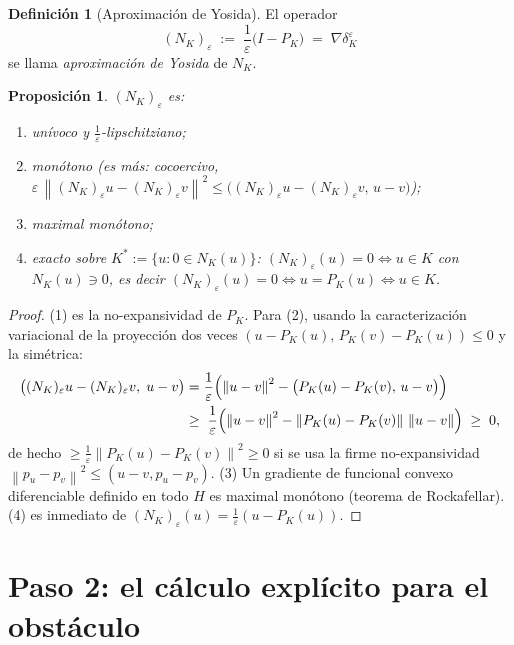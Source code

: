 \documentclass[11pt,a4paper]{article}
\newtheorem{proposicion}[teorema]{Proposición}
\theoremstyle{definition}
\newtheorem{definicion}[teorema]{Definición}
\theoremstyle{remark}
\newcommand{\Norm}[1]{\left\lVert #1 \right\rVert}
\newcommand{\dke}{\delta_K^\varepsilon}
\newcommand{\pk}{P_K}
\begin{document}
\begin{definicion}[Aproximación de Yosida]
El operador
\[
(N_K)_\varepsilon
\;:=\; \frac{1}{\varepsilon}\bigl(I - \pk\bigr)
\;=\; \nabla \dke
\]
se llama \emph{aproximación de Yosida} de $N_K$.
\end{definicion}

\begin{proposicion}\label{prop:yosida-prop}
$(N_K)_\varepsilon$ es:
\begin{enumerate}
\item unívoco y $\tfrac{1}{\varepsilon}$-lipschitziano;
\item monótono (es más: cocoercivo, $\varepsilon\,\Norm{(N_K)_\varepsilon u - (N_K)_\varepsilon v}^2 \le \bigl((N_K)_\varepsilon u - (N_K)_\varepsilon v,\, u - v\bigr)$);
\item maximal monótono;
\item exacto sobre $K^\ast := \{ u : 0 \in N_K(u) \}$:
$(N_K)_\varepsilon(u) = 0 \iff u \in K$ con $N_K(u) \ni 0$, es decir
$(N_K)_\varepsilon(u) = 0 \iff u = \pk(u) \iff u \in K$.
\end{enumerate}
\end{proposicion}

\begin{proof}
(1) es la no-expansividad de $\pk$. Para (2), usando la caracterización
variacional de la proyección dos veces
$(u - \pk(u),\, \pk(v) - \pk(u)) \le 0$ y la simétrica:
\begin{align*}
\bigl((N_K)_\varepsilon u - (N_K)_\varepsilon v,\; u - v\bigr)
&= \frac{1}{\varepsilon}\Bigl(\Norm{u-v}^2 - \bigl(\pk(u) - \pk(v),\, u-v\bigr)\Bigr)\\
&\ge\; \frac{1}{\varepsilon}\Bigl(\Norm{u-v}^2 - \Norm{\pk(u)-\pk(v)}\,\Norm{u-v}\Bigr)
\;\ge\; 0 ,
\end{align*}
de hecho $\ge \frac{1}{\varepsilon}\Norm{\pk(u)-\pk(v)}^2 \ge 0$ si se usa
la firme no-expansividad $\Norm{p_u - p_v}^2 \le (u-v, p_u - p_v)$.
(3) Un gradiente de funcional convexo diferenciable definido en todo $H$
es maximal monótono (teorema de Rockafellar). (4) es inmediato de
$(N_K)_\varepsilon(u) = \frac{1}{\varepsilon}(u - \pk(u))$.
\end{proof}

\section{Paso 2: el cálculo explícito para el obstáculo}
\end{document}
